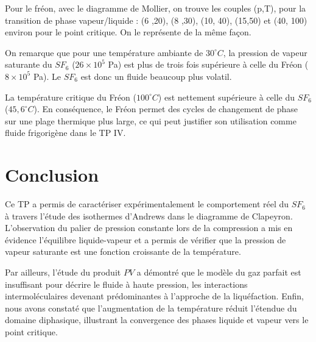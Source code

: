 \documentclass[a4paper,9pt,french]{scrartcl}
\begin{document}
Pour le fréon, avec le diagramme de Mollier, on trouve les couples (p,T), pour la transition de phase vapeur/liquide :
(6 ,20), (8 ,30), (10, 40), (15,50) et (40, 100) environ pour le point critique. On le représente de la m\^eme façon.

On remarque que pour une température ambiante de $30^\circ C$, la pression de vapeur saturante du $SF_6$ ($26 \times 10^5$ Pa) est plus de trois fois supérieure à celle du Fréon ($8 \times 10^5$ Pa). Le $SF_6$ est donc un fluide beaucoup plus volatil.

La température critique du Fréon ($100^\circ C$) est nettement supérieure à celle du $SF_6$ ($45,6^\circ C$). 
En conséquence, le Fréon permet des cycles de changement de phase sur une plage thermique plus large, ce qui peut justifier son utilisation comme fluide frigorigène dans le TP IV.

\section{Conclusion}

Ce TP a permis de caractériser expérimentalement le comportement réel du $SF_6$ à travers 
l'étude des isothermes d'Andrews dans le diagramme de Clapeyron. 
L'observation du palier de pression constante lors de la compression a mis
 en évidence l'équilibre liquide-vapeur et a permis de vérifier que la pression
  de vapeur saturante est une fonction croissante de la température. 

Par ailleurs, l'étude du produit $PV$ a démontré que 
le modèle du gaz parfait est insuffisant pour décrire le fluide 
à haute pression, les interactions intermoléculaires devenant 
prédominantes à l'approche de la liquéfaction. Enfin, nous avons constaté que
 l'augmentation de la température réduit l'étendue du domaine diphasique, 
 illustrant la convergence des phases liquide et vapeur vers le point critique.
\end{document}
